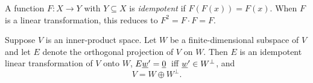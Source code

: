 \begin{definition}
A function $F: X \rightarrow Y$ with $Y \subseteq X$ is \emph{idempotent} if $F(F(x))=F(x)$.  When $F$ is a linear transformation, this reduces to $F^2 = F \cdot F = F$.
\end{definition}

\begin{theorem} \label{theorem:OrthogonalSubspaceDirectSum}
Suppose $V$ is an inner-product space.
Let $W$ be a finite-dimensional subspace of $V$ and let $E$ denote the orthogonal projection of $V$ on $W$.
Then $E$ is an idempotent linear transformation of $V$ onto $W$, $E \underline{w}' = \underline{0}\,$ iff $\underline{w}' \in W^{\bot}$, and
\begin{equation*}
V = W \oplus W^{\bot}.
\end{equation*}
\end{theorem}
